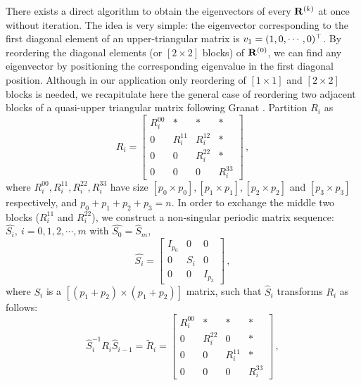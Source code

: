 There exists a direct algorithm to obtain the eigenvectors of every
$\mathbf{R}^{(k)}$ at once without iteration. The idea is very simple: the
eigenvector corresponding to the first diagonal element of an
upper-triangular matrix is $v_{1}=(1,0,\cdots,0)^\top $. By
reordering the diagonal elements (or $[2\!\times\! 2]$ blocks) of
$\mathbf{R}^{(0)}$, we can find any eigenvector by positioning the corresponding
eigenvalue in the first diagonal position. Although in our application
only reordering of $[1\!\times\! 1]$ and $[2\!\times\! 2]$ blocks is
needed, we recapitulate here the general case of reordering two adjacent
blocks of a quasi-upper triangular matrix following
Granat {\etal}.
Partition $R_{i}$ as
\[
  R_{i}=
  \left[
    \begin{array}{c|cc|c}
      R^{00}_{i} & * & *& * \\ \hline
      0 & R^{11}_{i} & R^{12}_{i} & * \\
      0 & 0 & R^{22}_{i} & * \\ \hline
      0 & 0 & 0 & R^{33}_{i}
    \end{array}
  \right]
  \,,
\]
where $R^{00}_{i}, R^{11}_{i},R^{22}_{i},R^{33}_{i}$ have size
$[p_{0}\!\times\! p_{0}], [p_{1}\!\times\! p_{1}], [p_{2}\!\times\!
p_{2}]$ and $[p_{3}\!\times\! p_{3}]$ respectively, and
$p_{0}+p_{1}+p_{2}+p_{3}=n$. In order to exchange the middle two blocks
($R^{11}_{i}$ and $R^{22}_{i}$), we construct a non-singular periodic
matrix sequence: $\hat{S_{i}},\:i=0,1,2,\cdots,m$ with
$\hat{S_{0}}=\hat{S}_{m}$,
\[
  \hat{S_{i}}=
  \left[
    \begin{array}{c|c|c}
      I_{p_{0}} & 0 & 0  \\ \hline
      0 & S_{i} & 0 \\ \hline
      0 & 0 & I_{p_{3}}
    \end{array}
  \right]
  \,,
\]
where $S_{i}$ is a $[(p_{1}+p_{2})\!\times\! (p_{1}+p_{2})]$ matrix,
such that $\hat{S}_{i}$ transforms $R_{i}$ as follows:
\begin{equation}
  \label{eq:xdtransform}
  \hat{S}_{i}^{-1}R_{i}\hat{S}_{i-1}=\tilde{R}_{i}=
  \left[
    \begin{array}{c|cc|c}
      R^{00}_{i} & * & *& * \\ \hline
      0 & R^{22}_{i} & 0 & * \\
      0 & 0 & R^{11}_{i} & * \\ \hline
      0 & 0 & 0 & R^{33}_{i}
    \end{array}
  \right]
  \,,
\end{equation}
